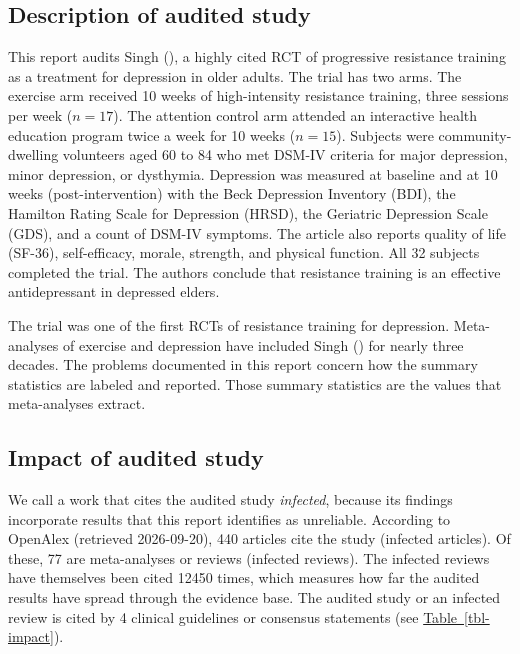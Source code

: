 \documentclass[
  letterpaper,
  DIV=11,
  numbers=noendperiod]{scrartcl}
\begin{document}
\subsection{Description of audited
study}\label{description-of-audited-study}

This report audits Singh (), a highly
cited RCT of progressive resistance training as a treatment for
depression in older adults. The trial has two arms. The exercise arm
received 10 weeks of high-intensity resistance training, three sessions
per week (\(n = 17\)). The attention control arm attended an interactive
health education program twice a week for 10 weeks (\(n = 15\)).
Subjects were community-dwelling volunteers aged 60 to 84 who met DSM-IV
criteria for major depression, minor depression, or dysthymia.
Depression was measured at baseline and at 10 weeks (post-intervention)
with the Beck Depression Inventory (BDI), the Hamilton Rating Scale for
Depression (HRSD), the Geriatric Depression Scale (GDS), and a count of
DSM-IV symptoms. The article also reports quality of life (SF-36),
self-efficacy, morale, strength, and physical function. All 32 subjects
completed the trial. The authors conclude that resistance training is an
effective antidepressant in depressed elders.

The trial was one of the first RCTs of resistance training for
depression. Meta-analyses of exercise and depression have included Singh
() for nearly three decades. The problems
documented in this report concern how the summary statistics are labeled
and reported. Those summary statistics are the values that meta-analyses
extract.

\subsection{Impact of audited study}\label{impact-of-audited-study}

We call a work that cites the audited study \emph{infected}, because its
findings incorporate results that this report identifies as unreliable.
According to OpenAlex (retrieved 2026-09-20), 440 articles cite the
study (infected articles). Of these, 77 are meta-analyses or reviews
(infected reviews). The infected reviews have themselves been cited
12450 times, which measures how far the audited results have spread
through the evidence base. The audited study or an infected review is
cited by 4 clinical guidelines or consensus statements (see
\hyperref[tbl-impact]{Table~\ref*{tbl-impact}}).
\end{document}
